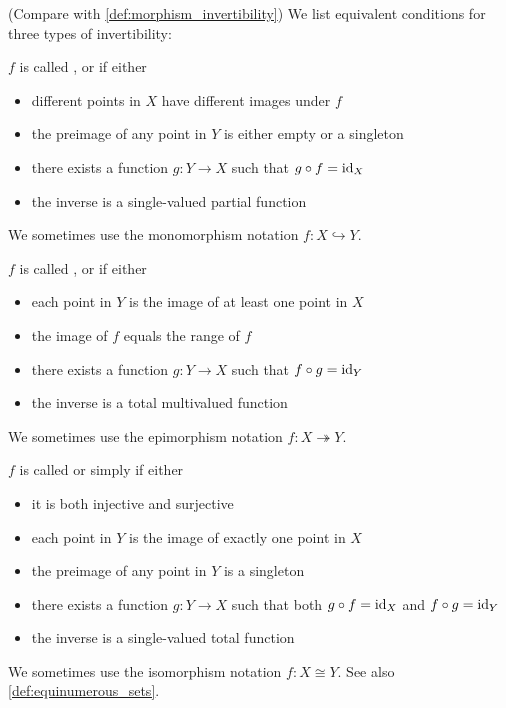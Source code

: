 \begin{definition}\label{def:function_invertibility}(Compare with \cref{def:morphism_invertibility})
  We list equivalent conditions for three types of invertibility:
  \begin{defenum}
     \( f \) is called ,  or  if either
    \begin{itemize}
      \item different points in \( X \) have different images under \( f \)
      \item the preimage of any point in \( Y \) is either empty or a singleton
      \item there exists a function \( g: Y \to X \) such that \( g \circ f = \operatorname{id}_X \)
      \item the inverse is a single-valued partial function
    \end{itemize}

    We sometimes use the monomorphism notation \( f: X \hookrightarrow Y \).

     \( f \) is called ,  or  if either
    \begin{itemize}
      \item each point in \( Y \) is the image of at least one point in \( X \)
      \item the image of \( f \) equals the range of \( f \)
      \item there exists a function \( g: Y \to X \) such that \( f \circ g = \operatorname{id}_Y \)
      \item the inverse is a total multivalued function
    \end{itemize}

    We sometimes use the epimorphism notation \( f: X \twoheadrightarrow Y \).

     \( f \) is called  or simply  if either
    \begin{itemize}
      \item it is both injective and surjective
      \item each point in \( Y \) is the image of exactly one point in \( X \)
      \item the preimage of any point in \( Y \) is a singleton
      \item there exists a function \( g: Y \to X \) such that both \( g \circ f = \operatorname{id}_X \) and \( f \circ g = \operatorname{id}_Y \)
      \item the inverse is a single-valued total function
    \end{itemize}

    We sometimes use the isomorphism notation \( f: X \cong Y \). See also \cref{def:equinumerous_sets}.
  \end{defenum}
\end{definition}

